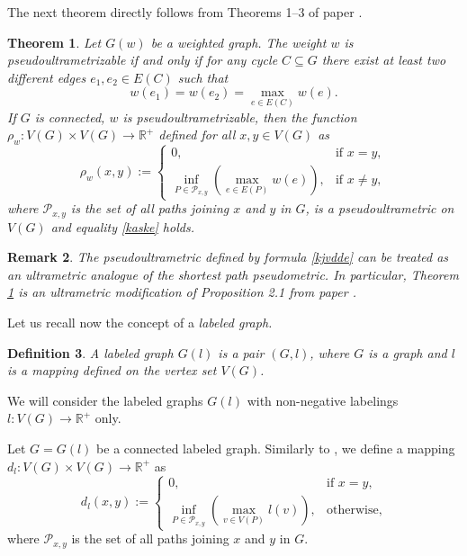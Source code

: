 \documentclass[pdflatex,sn-mathphys-num]{sn-jnl}%
\theoremstyle{thmstyleone}%
\newtheorem{Theorem}{Theorem}[section]
\theoremstyle{thmstyletwo}%
\newtheorem{Remark}[Theorem]{Remark}
\theoremstyle{thmstylethree}%
\newtheorem{Definition}[Theorem]{Definition}
\theoremstyle{thmstyletwo}%
\theoremstyle{thmstylethree}%
\begin{document}
The next theorem directly follows from Theorems 1--3 of paper \cite{DP2013SM}.

\begin{Theorem}\label{kasya} Let $G(w)$ be a  weighted graph. The weight $w$ is pseudoultrametrizable if and only if for any cycle $C \subseteq G$ there exist at least two different edges $e_1, e_2 \in E(C)$ such that
\begin{equation}
    \label{samf}
w(e_1) = w(e_2) = \max_{e \in E(C)} w(e).
\end{equation}
If $G$ is connected, $w$ is  pseudoultrametrizable, then the function $\rho_w : V(G) \times V(G) \to \mathbb{R}^+$ defined for all $x,y \in V(G)$ as 
\begin{equation}
    \label{kjvdde}
\rho_w(x,y) :=
\begin{cases}
0, & \text{if } x = y,\\[6pt]
\inf\limits_{P \in \mathcal{P}_{x,y}} \left( \max\limits_{e \in E(P)} w(e) \right), & \text{if } x \ne y,
\end{cases}
\end{equation}
where $\mathcal{P}_{x,y}$ is the set of all paths joining  $x$ and $y$ in $G$, is a pseudoultrametric on $V(G)$ and equality \eqref{kaske} holds.
\end{Theorem}


\begin{Remark}\label{kaf}The pseudoultrametric defined by formula \eqref{kjvdde} can be treated as an ultrametric analogue of the {\it shortest path} pseudometric. In particular, Theorem \ref{kasya} is an ultrametric modification of Proposition 2.1 from paper \cite{DMV2013AC}.
\end{Remark}



Let us recall now the concept of a {\it labeled graph.} 



\begin{Definition} A labeled graph $G(l)$ is a pair $(G,l)$, where $G$ is a graph and $l$ is a mapping defined on the vertex set $V(G)$.
\end{Definition}

We will consider
the labeled graphs
$G(l)$ with non-negative labelings $l\colon V(G) \to \mathbb R^+$ only.



Let $G = G(l)$ be a connected labeled graph. Similarly to \cite{Dov2020TaAoG}, we define a mapping $d_l : V(G) \times V(G) \to \mathbb{R}^+$ as
\begin{equation}
    \label{fdes1}
d_l(x,y) := 
\begin{cases}
0, & \text{if } x = y,\\
\inf\limits_{P\in \mathcal{P}_{x,y}}\left(\max\limits_{v\in V(P)} l(v)\right), & \text{otherwise},
\end{cases}
\end{equation}
where $\mathcal{P}_{x,y}$ is the set of all paths  joining $x$ and $y$ in $G$.
\end{document}
